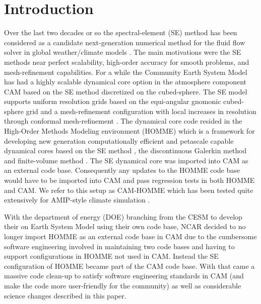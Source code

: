 \documentclass{agujournal}
\begin{document}
\section{Introduction}
Over the last two decades or so the spectral-element (SE) method has been considered as a candidate next-generation numerical method for the fluid flow solver in  global weather/climate models \citep{FT2004MWR,BWTF2006MWR,KG2012JCP,GKC2013SIAM} {\color{red}{other references needed?}}. The main motivations were the SE methods near perfect scalability, high-order accuracy for smooth problems, and mesh-refinement capabilities. For a while the Community Earth System Model \citep[CESM; ][]{CESM1} has had a highly scalable dynamical core option in the atmosphere component CAM \citep[Community Atmosphere Model; ][]{CAM5} based on the SE method discretized on the cubed-sphere. The SE model supports uniform resolution grids based on the equi-angular gnomonic cubed-sphere grid and a mesh-refinement configuration with local increases in resolution through conformal mesh-refinement \citep{FT2004MWR,BWTF2006MWR,ZJT2013,ZetAl2014JCb}. The dynamical core code resided in the High-Order Methods Modeling environment (HOMME) which is a framework for developing new generation computationally efficient and petascale capable dynamical cores based on the SE method \citep{TL2000JSC,TES2008JPCS}, the discontinuous Galerkin method \citep{NCT2009CF} and finite-volume method \citep{ELGT2012PCS,LTOUNGK2017MWR}. The SE dynamical core was imported into CAM as an external code base. Consequently any updates to the HOMME code base would have to be imported into CAM and pass regression tests in both HOMME and CAM. We refer to this setup as CAM-HOMME which has been tested quite extensively for AMIP-style climate simulation \citep{ELMNTT2012JC,BetAl2013JC,RetAl2015GRL}.

With the department of energy (DOE) branching from the CESM to develop their on Earth System Model using their own code base, NCAR decided to no longer import HOMME as an external code base in CAM due to the cumbersome software engineering involved in maintaining two code bases and having to support configurations in HOMME not used in CAM. Instead the SE configuration of HOMME became part of the CAM code base. With that came a massive code clean-up to satisfy software engineering standards in CAM (and make the code more user-friendly for the community) as well as considerable science changes described in this paper.
\end{document}

